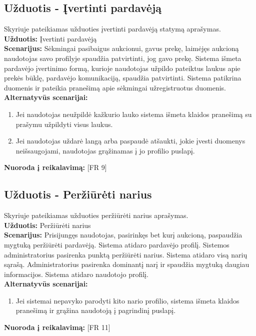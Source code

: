 \documentclass{VUMIFPSkursinis}
\begin{document}
	\subsection{Užduotis - Įvertinti pardavėją}
	Skyriuje pateikiamas užduoties įvertinti pardavėją statymą aprašymas.\\
	\textbf{Užduotis:}  Įvertinti pardavėją \\
	\textbf{Scenarijus:}  Sėkmingai pasibaigus aukcionui, gavus prekę, laimėjęs aukcioną naudotojas savo profilyje spaudžia patvirtinti, jog gavo prekę. Sistema išmeta pardavėjo įvertinimo formą, kurioje naudotojas užpildo pateiktus laukus apie prekės būklę, pardavėjo komunikaciją, spaudžia patvirtinti. Sistema patikrina duomenis ir pateikia pranešimą apie sėkmingai užregistruotus duomenis. \\
	\textbf{Alternatyvūs scenarijai:}
	\begin{enumerate}
		\item Jei naudotojas neužpildė kažkurio lauko sistema išmeta klaidos pranešimą su prašymu užpildyti visus laukus. 
		\item Jei naudotojas uždarė langą arba paspaudė atšaukti, jokie įvesti duomenys neišsaugojami, naudotojas grąžinamas į jo profilio puslapį. 
	\end{enumerate}
	\textbf{Nuoroda į reikalavimą: } [FR 9]
	
	\subsection{Užduotis - Peržiūrėti narius}
	Skyriuje pateikiamas užduoties peržiūrėti narius aprašymas.\\
	\textbf{Užduotis:}  Peržiūrėti narius \\
	\textbf{Scenarijus:}  Prisijungęs naudotojas, pasirinkęs bet kurį aukcioną, paspaudžia mygtuką peržiūrėti pardavėją. Sistema atidaro pardavėjo profilį. Sistemos administratorius pasirenka punktą peržiūrėti narius. Sistema atidaro visą narių sąrašą. Administratorius pasirenka dominantį narį ir spaudžia mygtuką daugiau informacijos. Sistema atidaro naudotojo profilį. \\
	\textbf{Alternatyvūs scenarijai:}
	\begin{enumerate}
		\item Jei sistemai nepavyko parodyti kito nario profilio, sistema išmeta klaidos pranešimą ir grąžina naudotoją į pagrindinį puslapį. 
	\end{enumerate}
	\textbf{Nuoroda į reikalavimą: } [FR 11]
	
\end{document}
